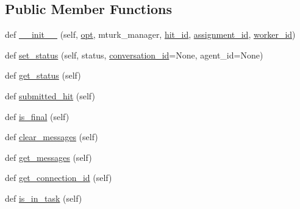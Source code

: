 \subsection*{Public Member Functions}
\begin{DoxyCompactItemize}
\item 
def \hyperlink{classparlai_1_1mturk_1_1core_1_1dev_1_1agents_1_1MTurkAgent_ad3009e853c4e97d98169a496ac21d5a5}{\+\_\+\+\_\+init\+\_\+\+\_\+} (self, \hyperlink{classparlai_1_1core_1_1agents_1_1Agent_ab3b45d2754244608c75d4068b90cd051}{opt}, mturk\+\_\+manager, \hyperlink{classparlai_1_1mturk_1_1core_1_1dev_1_1agents_1_1MTurkAgent_a0c4bc04bc9580f459a7fce557617de3d}{hit\+\_\+id}, \hyperlink{classparlai_1_1mturk_1_1core_1_1dev_1_1agents_1_1MTurkAgent_a626d08bc1b934a5aa942d2fdeb58bf19}{assignment\+\_\+id}, \hyperlink{classparlai_1_1mturk_1_1core_1_1dev_1_1agents_1_1MTurkAgent_a226a367f5473cbf5689ed91043ceb097}{worker\+\_\+id})
\item 
def \hyperlink{classparlai_1_1mturk_1_1core_1_1dev_1_1agents_1_1MTurkAgent_ade82426c779f110dc1b5f5b309e4a281}{set\+\_\+status} (self, status, \hyperlink{classparlai_1_1mturk_1_1core_1_1dev_1_1agents_1_1MTurkAgent_a08c2c41c20d4ccc7fa4eb3e349a2790b}{conversation\+\_\+id}=None, agent\+\_\+id=None)
\item 
def \hyperlink{classparlai_1_1mturk_1_1core_1_1dev_1_1agents_1_1MTurkAgent_a2423bb27d86be375313b61a60a12be0d}{get\+\_\+status} (self)
\item 
def \hyperlink{classparlai_1_1mturk_1_1core_1_1dev_1_1agents_1_1MTurkAgent_a6662232ebdd301d2547c2433cd0386f3}{submitted\+\_\+hit} (self)
\item 
def \hyperlink{classparlai_1_1mturk_1_1core_1_1dev_1_1agents_1_1MTurkAgent_a07577b6f15ab8b64d2bd2aba87a5e011}{is\+\_\+final} (self)
\item 
def \hyperlink{classparlai_1_1mturk_1_1core_1_1dev_1_1agents_1_1MTurkAgent_aaf5f9772de3c1f0c0efe0cf2dc98965d}{clear\+\_\+messages} (self)
\item 
def \hyperlink{classparlai_1_1mturk_1_1core_1_1dev_1_1agents_1_1MTurkAgent_a51dcf248b6b614e391f83ff6a195787c}{get\+\_\+messages} (self)
\item 
def \hyperlink{classparlai_1_1mturk_1_1core_1_1dev_1_1agents_1_1MTurkAgent_abba4a01586ccd7b85e31175cf5c9f487}{get\+\_\+connection\+\_\+id} (self)
\item 
def \hyperlink{classparlai_1_1mturk_1_1core_1_1dev_1_1agents_1_1MTurkAgent_a041a1bf11cb466ca9e270c4e423f2a9c}{is\+\_\+in\+\_\+task} (self)
\item 

\end{DoxyCompactItemize}
